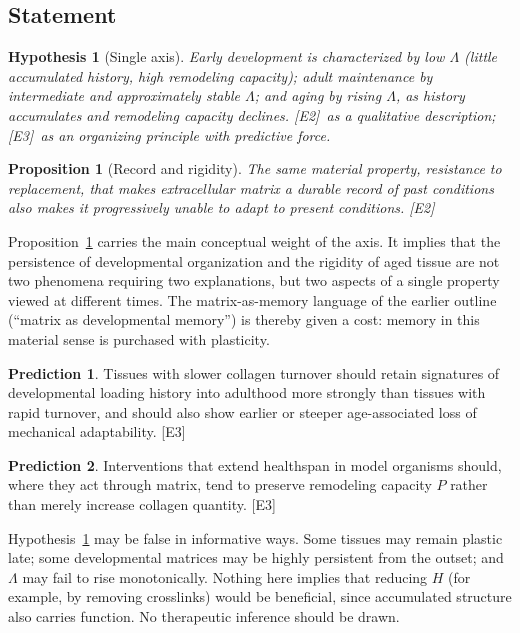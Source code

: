 \documentclass[11pt,a4paper]{article}
\theoremstyle{plain}
\newtheorem{proposition}{Proposition}[section]
\newtheorem{hypothesis}{Hypothesis}[section]
\theoremstyle{definition}
\newtheorem{prediction}{Prediction}[section]
\theoremstyle{remark}
\newcommand{\tier}[1]{\textup{\textsc{[#1]}}}
\newcommand{\Etwo}{\tier{E2}}
\newcommand{\Ethree}{\tier{E3}}
\begin{document}
\subsection{Statement}

\begin{hypothesis}[Single axis]\label{hyp:axis}
Early development is characterized by low $\Lambda$ (little accumulated history, high remodeling capacity); adult maintenance by intermediate and approximately stable $\Lambda$; and aging by rising $\Lambda$, as history accumulates and remodeling capacity declines. \Etwo\ as a qualitative description; \Ethree\ as an organizing principle with predictive force.
\end{hypothesis}

\begin{proposition}[Record and rigidity]\label{prop:tradeoff}
The same material property, resistance to replacement, that makes extracellular matrix a durable record of past conditions also makes it progressively unable to adapt to present conditions. \Etwo
\end{proposition}

Proposition~\ref{prop:tradeoff} carries the main conceptual weight of the axis. It implies that the persistence of developmental organization and the rigidity of aged tissue are not two phenomena requiring two explanations, but two aspects of a single property viewed at different times. The matrix-as-memory language of the earlier outline (``matrix as developmental memory'') is thereby given a cost: memory in this material sense is purchased with plasticity.

\begin{prediction}\label{pred:axis1}
Tissues with slower collagen turnover should retain signatures of developmental loading history into adulthood more strongly than tissues with rapid turnover, and should also show earlier or steeper age-associated loss of mechanical adaptability. \Ethree
\end{prediction}

\begin{prediction}\label{pred:axis2}
Interventions that extend healthspan in model organisms should, where they act through matrix, tend to preserve remodeling capacity $P$ rather than merely increase collagen quantity. \Ethree
\end{prediction}

\begin{caution}
Hypothesis~\ref{hyp:axis} may be false in informative ways. Some tissues may remain plastic late; some developmental matrices may be highly persistent from the outset; and $\Lambda$ may fail to rise monotonically. Nothing here implies that reducing $H$ (for example, by removing crosslinks) would be beneficial, since accumulated structure also carries function. No therapeutic inference should be drawn.
\end{caution}
\end{document}
